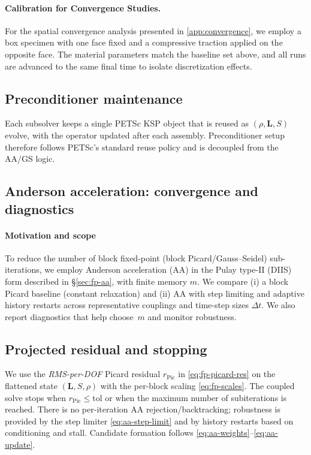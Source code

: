 \paragraph{Calibration for Convergence Studies.}
For the spatial convergence analysis presented in \ref{app:convergence}, we employ a box specimen with one face fixed and a compressive traction applied on the opposite face. The material parameters match the baseline set above, and all runs are advanced to the same final time to isolate discretization effects.

\subsection*{Preconditioner maintenance}\label{subsec:ksp_defaults}
Each subsolver keeps a single PETSc KSP object that is reused as $(\rho,\mathbf{L},S)$ evolve, with the operator updated after each assembly. Preconditioner setup therefore follows PETSc's standard reuse policy and is decoupled from the AA/GS logic.

\subsection*{Anderson acceleration: convergence and diagnostics}
\label{subsec:anderson}
\paragraph{Motivation and scope}
To reduce the number of block fixed-point (block Picard/Gauss--Seidel) sub-iterations, we employ Anderson acceleration (AA) in the Pulay type-II (DIIS) form described in \S\ref{sec:fp-aa}, with finite memory $m$. We compare (i) a block Picard baseline (constant relaxation) and (ii) AA with step limiting and adaptive history restarts across representative couplings and time-step sizes $\Delta t$. We also report diagnostics that help choose~$m$ and monitor robustness.

\subsection*{Projected residual and stopping}\label{subsec:proj_merit}
We use the \emph{RMS-per-DOF} Picard residual $r_{\mathrm{Pic}}$ in \eqref{eq:fp-picard-res} on the flattened state $(\mathbf L,S,\rho)$ with the per-block scaling \eqref{eq:fp-scales}. The coupled solve stops when $r_{\mathrm{Pic}}\le \mathrm{tol}$ or when the maximum number of subiterations is reached. There is no per-iteration AA rejection/backtracking; robustness is provided by the step limiter \eqref{eq:aa-step-limit} and by history restarts based on conditioning and stall. Candidate formation follows \eqref{eq:aa-weights}--\eqref{eq:aa-update}.

